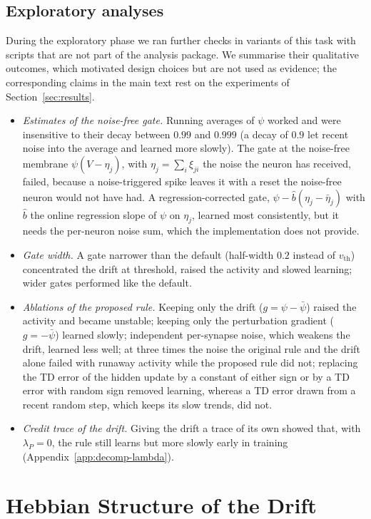 \documentclass[10pt,twocolumn]{article}
\begin{document}
\subsection{Exploratory analyses}
\label{app:gridtoy-exploratory}
During the exploratory phase we ran further checks in variants of this task with
scripts that are not part of the analysis package. We summarise their qualitative
outcomes, which motivated design choices but are not used as evidence; the
corresponding claims in the main text rest on the experiments of
Section~\ref{sec:results}.
\begin{itemize}
\item \emph{Estimates of the noise-free gate.} Running averages of $\psi$ worked and
were insensitive to their decay between $0.99$ and $0.999$ (a decay of $0.9$ let
recent noise into the average and learned more slowly). The gate at the noise-free
membrane $\psi(V-\eta_j)$, with $\eta_j=\sum_i\xi_{ji}$ the noise the neuron has
received, failed, because a noise-triggered spike leaves it with a reset the
noise-free neuron would not have had. A regression-corrected gate,
$\psi-\hat b(\eta_j-\bar\eta_j)$ with $\hat b$ the online regression slope of $\psi$ on
$\eta_j$, learned most consistently, but it needs the per-neuron noise sum, which the
implementation does not provide.
\item \emph{Gate width.} A gate narrower than the default (half-width $0.2$ instead
of $v_{\mathrm{th}}$) concentrated the drift at threshold, raised the activity and
slowed learning; wider gates performed like the default.
\item \emph{Ablations of the proposed rule.} Keeping only the drift ($g=\psi-\bar\psi$)
raised the activity and became unstable; keeping only the perturbation gradient
($g=-\bar\psi$) learned slowly; independent per-synapse noise, which weakens the
drift, learned less well; at three times the noise the original rule and the drift
alone failed with runaway activity while the proposed rule did not; replacing the
TD error of the hidden update by a constant of either sign or by a TD error with
random sign removed learning, whereas a TD error drawn from a recent random step,
which keeps its slow trends, did not.
\item \emph{Credit trace of the drift.} Giving the drift a trace of its own showed
that, with $\lambda_P=0$, the rule still learns but more slowly early in training
(Appendix~\ref{app:decomp-lambda}).
\end{itemize}

\section{Hebbian Structure of the Drift}
\label{app:hebb}
\end{document}
